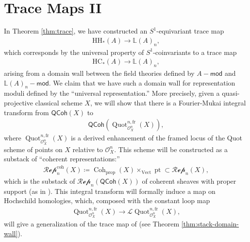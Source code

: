 \documentclass{article}
\numberwithin{equation}{section}
\theoremstyle{quest}
\theoremstyle{definition}
\theoremstyle{remark}
\newcommand{\msf}{\mathsf}
\newcommand{\Mod}{-\msf{mod}}
\DeclareMathOperator{\pt}{pt}
\DeclareMathOperator{\Coh}{Coh}
\DeclareMathOperator{\Quot}{Quot}
\DeclareMathOperator{\Vect}{Vect}
\begin{document}
\section{Trace Maps II}\label{sec:trace-maps-II}
In Theorem \ref{thm:trace}, we have constructed an $S^1$-equivariant trace map
\begin{align*}
	\mathrm H\mathrm H_*(A) \to \mathbb{L}(A)_n,
\end{align*} 
which corresponds by the universal property of $S^1$-coinvariants to a trace map
\begin{align*}
	\mathrm{HC}_*(A)\to \mathbb{L}(A)_n,
\end{align*} 
arising from a domain wall between the field theories defined by $A\Mod$ and $\mathbb{L}(A)_n\Mod$. We claim that we have such a domain wall for representation moduli defined by the ``universal representation.'' More precisely, given a quasi-projective classical scheme $X$, we will show that there is a Fourier-Mukai integral transform from $\mathsf{QCoh}(X)$ to 
\begin{align*}
	\mathsf{QCoh}(\Quot^{n,\text{fr}}_{\mathscr{O}_X^n}(X)),
\end{align*} 
 where $\Quot^{n,\text{fr}}_{\mathscr{O}_X^n}(X)$ is a derived enhancement of the framed locus of the Quot scheme of points on $X$ relative to $\mathscr{O}_X^n$. This scheme will be constructed as a substack of ``coherent representations:''
 \begin{align*}
 	\mathscr{Rep}_n^{\text{coh}}(X)\coloneqq \Coh_{\text{prop}}(X)\times _{\Vect}\pt \subset \mathscr{Rep}_n(X),
 \end{align*} 
 which is the substack of $\mathscr{Rep}_n(\mathsf{QCoh}(X))$ of coherent sheaves with proper support (as in \cite{PS}). This integral transform will formally induce a map on Hochschild homologies, which, composed with the constant loop map
 \begin{align*}
 \Quot^{n,\text{fr}}_{\mathscr{O}_X^n}(X)\to 	\mathscr{L}\Quot^{n,\text{fr}}_{\mathscr{O}_X^n}(X),
 \end{align*} 
 will give a generalization of the trace map of \cite{BKR} (see Theorem \ref{thm:stack-domain-wall}).
\end{document}
